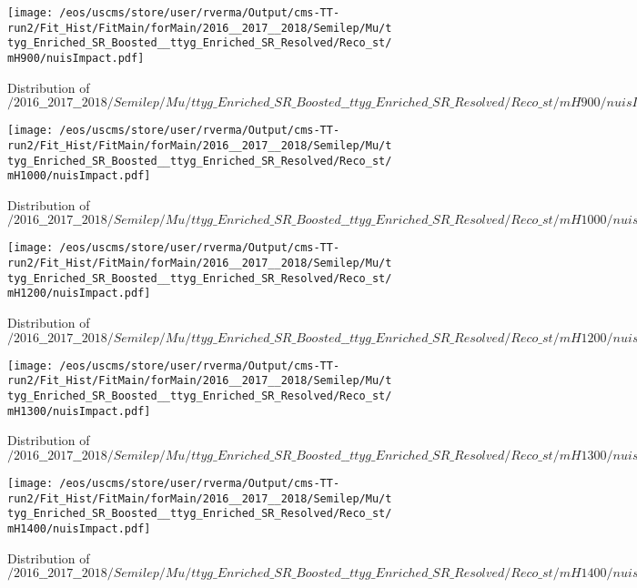 \begin{figure}
\centering
\texttt{[image: /eos/uscms/store/user/rverma/Output/cms-TT-run2/Fit\_Hist/FitMain/forMain/2016\_\_2017\_\_2018/Semilep/Mu/ttyg\_Enriched\_SR\_Boosted\_\_ttyg\_Enriched\_SR\_Resolved/Reco\_st/mH900/nuisImpact.pdf]}
\caption{Distribution of $/2016\_\_2017\_\_2018/Semilep/Mu/ttyg\_Enriched\_SR\_Boosted\_\_ttyg\_Enriched\_SR\_Resolved/Reco\_st/mH900/nuisImpact.pdf$}
\end{figure}

\begin{figure}
\centering
\texttt{[image: /eos/uscms/store/user/rverma/Output/cms-TT-run2/Fit\_Hist/FitMain/forMain/2016\_\_2017\_\_2018/Semilep/Mu/ttyg\_Enriched\_SR\_Boosted\_\_ttyg\_Enriched\_SR\_Resolved/Reco\_st/mH1000/nuisImpact.pdf]}
\caption{Distribution of $/2016\_\_2017\_\_2018/Semilep/Mu/ttyg\_Enriched\_SR\_Boosted\_\_ttyg\_Enriched\_SR\_Resolved/Reco\_st/mH1000/nuisImpact.pdf$}
\end{figure}

\begin{figure}
\centering
\texttt{[image: /eos/uscms/store/user/rverma/Output/cms-TT-run2/Fit\_Hist/FitMain/forMain/2016\_\_2017\_\_2018/Semilep/Mu/ttyg\_Enriched\_SR\_Boosted\_\_ttyg\_Enriched\_SR\_Resolved/Reco\_st/mH1200/nuisImpact.pdf]}
\caption{Distribution of $/2016\_\_2017\_\_2018/Semilep/Mu/ttyg\_Enriched\_SR\_Boosted\_\_ttyg\_Enriched\_SR\_Resolved/Reco\_st/mH1200/nuisImpact.pdf$}
\end{figure}

\begin{figure}
\centering
\texttt{[image: /eos/uscms/store/user/rverma/Output/cms-TT-run2/Fit\_Hist/FitMain/forMain/2016\_\_2017\_\_2018/Semilep/Mu/ttyg\_Enriched\_SR\_Boosted\_\_ttyg\_Enriched\_SR\_Resolved/Reco\_st/mH1300/nuisImpact.pdf]}
\caption{Distribution of $/2016\_\_2017\_\_2018/Semilep/Mu/ttyg\_Enriched\_SR\_Boosted\_\_ttyg\_Enriched\_SR\_Resolved/Reco\_st/mH1300/nuisImpact.pdf$}
\end{figure}

\begin{figure}
\centering
\texttt{[image: /eos/uscms/store/user/rverma/Output/cms-TT-run2/Fit\_Hist/FitMain/forMain/2016\_\_2017\_\_2018/Semilep/Mu/ttyg\_Enriched\_SR\_Boosted\_\_ttyg\_Enriched\_SR\_Resolved/Reco\_st/mH1400/nuisImpact.pdf]}
\caption{Distribution of $/2016\_\_2017\_\_2018/Semilep/Mu/ttyg\_Enriched\_SR\_Boosted\_\_ttyg\_Enriched\_SR\_Resolved/Reco\_st/mH1400/nuisImpact.pdf$}
\end{figure}

